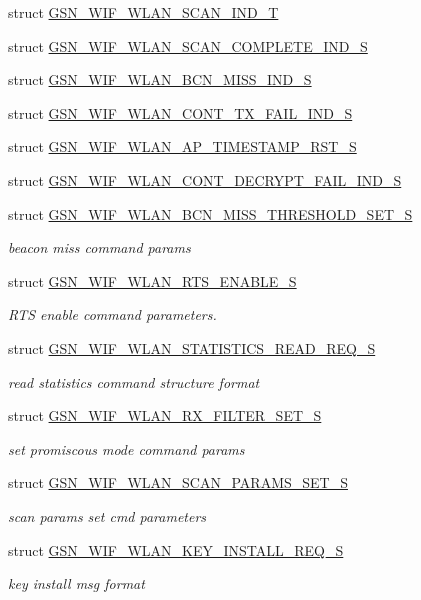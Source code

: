\begin{DoxyCompactItemize}
struct \hyperlink{a00400}{GSN\_\-WIF\_\-WLAN\_\-SCAN\_\-IND\_\-T}
\item 
struct \hyperlink{a00399}{GSN\_\-WIF\_\-WLAN\_\-SCAN\_\-COMPLETE\_\-IND\_\-S}
\item 
struct \hyperlink{a00371}{GSN\_\-WIF\_\-WLAN\_\-BCN\_\-MISS\_\-IND\_\-S}
\item 
struct \hyperlink{a00377}{GSN\_\-WIF\_\-WLAN\_\-CONT\_\-TX\_\-FAIL\_\-IND\_\-S}
\item 
struct \hyperlink{a00369}{GSN\_\-WIF\_\-WLAN\_\-AP\_\-TIMESTAMP\_\-RST\_\-S}
\item 
struct \hyperlink{a00376}{GSN\_\-WIF\_\-WLAN\_\-CONT\_\-DECRYPT\_\-FAIL\_\-IND\_\-S}
\item 
struct \hyperlink{a00372}{GSN\_\-WIF\_\-WLAN\_\-BCN\_\-MISS\_\-THRESHOLD\_\-SET\_\-S}
\begin{DoxyCompactList}\small\item\em beacon miss command params \end{DoxyCompactList}\item 
struct \hyperlink{a00396}{GSN\_\-WIF\_\-WLAN\_\-RTS\_\-ENABLE\_\-S}
\begin{DoxyCompactList}\small\item\em RTS enable command parameters. \end{DoxyCompactList}\item 
struct \hyperlink{a00406}{GSN\_\-WIF\_\-WLAN\_\-STATISTICS\_\-READ\_\-REQ\_\-S}
\begin{DoxyCompactList}\small\item\em read statistics command structure format \end{DoxyCompactList}\item 
struct \hyperlink{a00397}{GSN\_\-WIF\_\-WLAN\_\-RX\_\-FILTER\_\-SET\_\-S}
\begin{DoxyCompactList}\small\item\em set promiscous mode command params \end{DoxyCompactList}\item 
struct \hyperlink{a00401}{GSN\_\-WIF\_\-WLAN\_\-SCAN\_\-PARAMS\_\-SET\_\-S}
\begin{DoxyCompactList}\small\item\em scan params set cmd parameters \end{DoxyCompactList}\item 
struct \hyperlink{a00386}{GSN\_\-WIF\_\-WLAN\_\-KEY\_\-INSTALL\_\-REQ\_\-S}
\begin{DoxyCompactList}\small\item\em key install msg format \end{DoxyCompactList}\item 

\end{DoxyCompactItemize}
